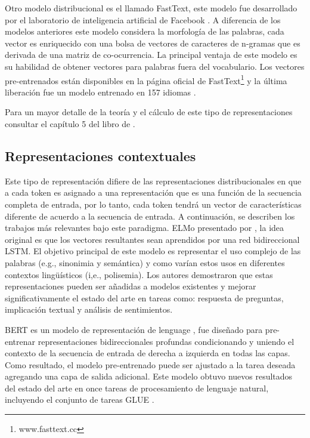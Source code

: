 Otro modelo distribucional es el llamado FastText, este modelo fue desarrollado por el laboratorio de inteligencia artificial de Facebook \citep{mikolov2017advances}. A diferencia de los modelos anteriores este modelo considera la morfología de las palabras, cada vector es enriquecido con una bolsa de vectores de caracteres de n-gramas que es derivada de una matriz de co-ocurrencia. La principal ventaja de este modelo es su habilidad de obtener vectores para palabras fuera del vocabulario. Los vectores pre-entrenados están disponibles en la página oficial de FastText\footnote{www.fasttext.cc}  y la última liberación fue un modelo entrenado en 157 idiomas \citep{grave2018learning}.

Para un mayor detalle de la teoría y el cálculo de este tipo de representaciones consultar el capítulo 5 del libro de \citep{kamath2019deep}.

\subsection{Representaciones contextuales}

Este tipo de representación difiere de las representaciones distribucionales en que a cada token es asignado a una representación que es una función de la secuencia completa de entrada, por lo tanto, cada token tendrá un vector de características diferente de acuerdo a la secuencia de entrada. A continuación, se describen los trabajos más relevantes bajo este paradigma. 
ELMo presentado por \citep{peters2018deep}, la idea original es que los vectores resultantes sean aprendidos por una red bidireccional LSTM. El objetivo principal de este modelo es representar el uso complejo de las palabras (e.g., sinonimia y semántica) y como varían estos usos en diferentes contextos lingüísticos (i,e., polisemia). Los autores demostraron que estas representaciones pueden ser añadidas a modelos existentes y mejorar significativamente el estado del arte en tareas como: respuesta de preguntas, implicación textual y análisis de sentimientos.

BERT es un modelo de representación de lenguage \cite{devlin2018bert}, fue diseñado para pre-entrenar representaciones bidireccionales profundas condicionando y uniendo el contexto de la secuencia de entrada de derecha a izquierda en todas las capas. Como resultado, el modelo pre-entrenado puede ser ajustado a la tarea deseada agregando una capa de salida adicional. Este modelo obtuvo nuevos resultados del estado del arte en once tareas de procesamiento de lenguaje natural, incluyendo el conjunto de tareas GLUE \cite{wang2018glue}.